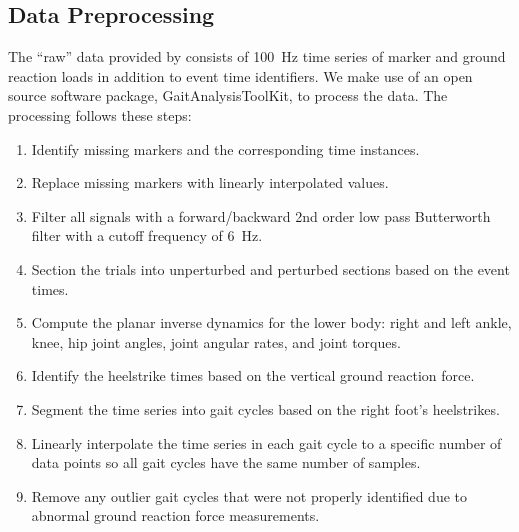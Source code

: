 \documentclass{article}
\begin{document}
\subsection*{Data Preprocessing}
%
The ``raw'' data provided by \cite{Moore2015} consists of 100~\si{\hertz} time
series of marker and ground reaction loads in addition to event time
identifiers. We make use of an open source software package,
GaitAnalysisToolKit, to process the data. The processing follows these steps:
%
\begin{enumerate}
  \item Identify missing markers and the corresponding time instances.
  \item Replace missing markers with linearly interpolated values.
  \item Filter all signals with a forward/backward 2nd order low pass
    Butterworth filter with a cutoff frequency of 6~\si{\hertz}.
  \item Section the trials into unperturbed and perturbed sections based on the
    event times.
  \item Compute the planar inverse dynamics for the lower body: right and left
    ankle, knee, hip joint angles, joint angular rates, and joint torques.
  \item Identify the heelstrike times based on the vertical ground reaction
    force.
  \item Segment the time series into gait cycles based on the right foot's
    heelstrikes.
  \item Linearly interpolate the time series in each gait cycle to a specific
    number of data points so all gait cycles have the same number of samples.
  \item Remove any outlier gait cycles that were not properly identified due to
    abnormal ground reaction force measurements.
\end{enumerate}
\end{document}
